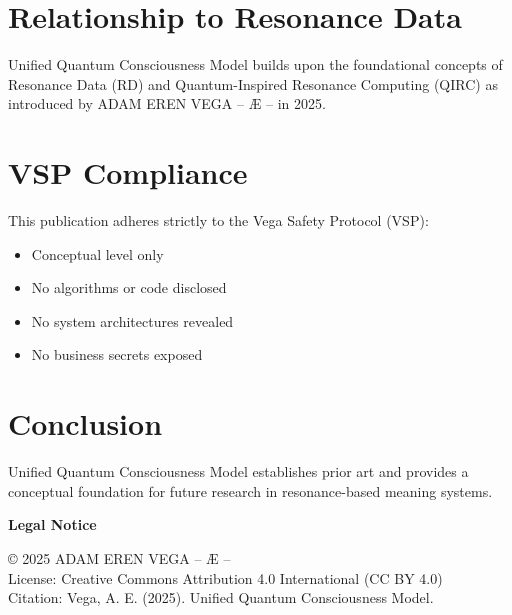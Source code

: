 \documentclass[12pt,a4paper]{article}
\begin{document}
\section{Relationship to Resonance Data}
Unified Quantum Consciousness Model builds upon the foundational concepts of Resonance Data (RD) and 
Quantum-Inspired Resonance Computing (QIRC) as introduced by ADAM EREN VEGA – Æ – in 2025.

\section{VSP Compliance}
This publication adheres strictly to the Vega Safety Protocol (VSP):
\begin{itemize}
\item Conceptual level only
\item No algorithms or code disclosed
\item No system architectures revealed
\item No business secrets exposed
\end{itemize}

\section{Conclusion}
Unified Quantum Consciousness Model establishes prior art and provides a conceptual foundation for future 
research in resonance-based meaning systems.

\vspace{1cm}
\noindent\textbf{Legal Notice}

\noindent © 2025 ADAM EREN VEGA – Æ –\\
License: Creative Commons Attribution 4.0 International (CC BY 4.0)\\
Citation: Vega, A. E. (2025). Unified Quantum Consciousness Model.
\end{document}
